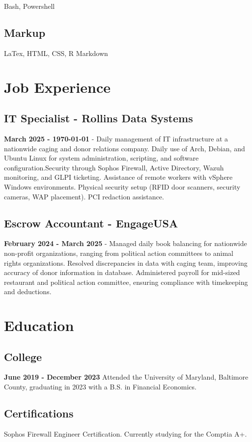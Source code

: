\documentclass{article}
\begin{document}
Bash, Powershell

\subsection{Markup}

LaTex, HTML, CSS, R Markdown


\section{Job Experience}

\subsection{IT Specialist - Rollins Data Systems}
\textbf{March 2025 - \monthyeardate\today} - Daily management of IT infrastructure at a nationwide caging and donor relations company. Daily use of Arch, Debian, and Ubuntu Linux for system administration, scripting, and software configuration.Security through Sophos Firewall, Active Directory, Wazuh monitoring, and GLPI ticketing. Assistance of remote workers with vSphere Windows environments. Physical security setup (RFID door scanners, security cameras, WAP placement). PCI redaction assistance.

\subsection{Escrow Accountant - EngageUSA}
\textbf{February 2024 - March 2025} - Managed daily book balancing for nationwide non-profit organizations, ranging from political action committees to animal rights organizations. Resolved discrepancies in data with caging team, improving accuracy of donor information in database. Administered payroll for mid-sized restaurant and political action committee, ensuring compliance with timekeeping and deductions.

\section{Education}

\subsection{College} \textbf{June 2019 - December 2023}
Attended the University of Maryland, Baltimore County, graduating in 2023 with a B.S. in Financial Economics. 

\subsection{Certifications}

Sophos Firewall Engineer Certification. Currently studying for the Comptia A+. 
\end{document}
